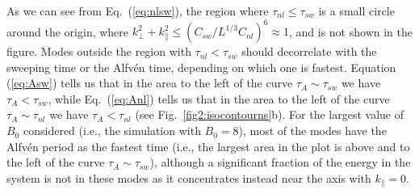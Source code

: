 \documentclass[aip,pop,reprint,amsmath,amssymb,floatfix]{revtex4-1}
\begin{document}
As we can see from Eq.~(\ref{eq:nlsw}), the region where
$\tau_{nl}\leq\tau_{sw}$ is a small circle around the origin, where
$k_\perp^2 + k_\parallel^2 \leq (C_{sw}/L^{1/3}C_{nl})^6 \approx 1$, and
is not shown in the figure. Modes outside the region with
$\tau_{nl}<\tau_{sw}$ should decorrelate with the sweeping time or the
Alfv\'en time, depending on which one is fastest. Equation 
(\ref{eq:Asw}) tells us that in the area to the left of the curve
$\tau_A\sim\tau_{sw}$ we have $\tau_A<\tau_{sw}$, while 
Eq.~(\ref{eq:Anl}) tells us that in the area to the left of the curve
$\tau_A\sim\tau_{nl}$ we have $\tau_A<\tau_{nl}$ (see
Fig.~\ref{fig2:isocontourns}b). For the largest value of $B_0$
considered (i.e., the simulation with $B_0=8$), most of the modes have
the Alfv\'en period as the fastest time (i.e., the largest area in the
plot is above and to the left of the curve $\tau_A \sim \tau_{sw}$),
although a significant fraction of the energy in the system is not in
these modes as it concentrates instead near the axis with 
$k_\parallel = 0$.
\end{document}
